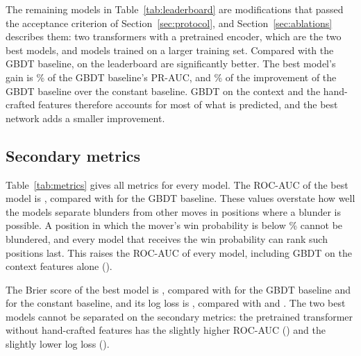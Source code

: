 \documentclass[11pt]{article}
\begin{document}
The remaining models in Table~\ref{tab:leaderboard} are modifications that
passed the acceptance criterion of Section~\ref{sec:protocol}, and
Section~\ref{sec:ablations} describes them\ifchangestart: two transformers
with a pretrained encoder, which are the two best models\fi\ifmore, and
models trained on a larger training set\fi. Compared with the GBDT baseline,
 on the leaderboard are significantly better. The best
model's gain is \% of the GBDT baseline's PR-AUC, and
\% of the improvement of the GBDT baseline over the
constant baseline. GBDT on the context and the hand-crafted features
therefore accounts for most of what is predicted, and the best network adds a
smaller improvement.

\subsection{Secondary metrics}

Table~\ref{tab:metrics} gives all metrics for every model. The ROC-AUC of the
best model is , compared with  for the
GBDT baseline. These values overstate how well the models separate blunders
from other moves in positions where a blunder is possible. A position in
which the mover's win probability is below \% cannot be
blundered, and every model that receives the win probability can rank such
positions last. This raises the ROC-AUC of every model, including GBDT on the
context features alone ().

The Brier score of the best model is , compared with
 for the GBDT baseline and  for the
constant baseline, and its log loss is , compared with
 and . The two best models cannot be
separated on the secondary metrics: the pretrained transformer without
hand-crafted features has the slightly higher ROC-AUC
() and the slightly lower log
loss ().

\begin{table}[htbp]\centering\small
{}
\caption{All metrics for every model on the test set. For PR-AUC and ROC-AUC
higher is better. For the Brier score, the log loss and the calibration
error lower is better.}
\label{tab:metrics}
\end{table}
\end{document}

